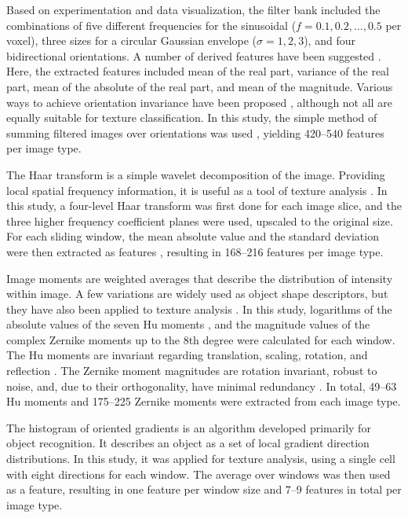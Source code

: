 \documentclass[10pt,letterpaper]{article}
\newcommand{\citep}{\cite}
\begin{document}
Based on experimentation and data visualization, the filter bank included the
combinations of five different frequencies for the sinusoidal
($f=0.1,0.2,…,0.5$ per voxel), three sizes for a circular Gaussian
envelope ($\sigma=1,2,3$), and four bidirectional orientations. A number of
derived features have been suggested \citep{Clausi2000, Hammouda2000,
Grigorescu2002}. Here, the extracted features included mean of the real part,
variance of the real part, mean of the absolute of the real part, and mean of
the magnitude. Various ways to achieve orientation invariance have been proposed
\citep{Arivazhagan2006, Han2007, Chu2009, Rahman2011}, although not all are
equally suitable for texture classification. In this study, the simple method of
summing filtered images over orientations was used \citep{Han2007}, yielding
420--540 features per image type.

The Haar transform is a simple wavelet decomposition of the image. Providing
local spatial frequency information, it is useful as a tool of texture analysis
\citep{Lonnestad1992}. In this study, a four-level Haar transform was first done
for each image slice, and the three higher frequency coefficient planes were
used, upscaled to the original size. For each sliding window, the mean absolute
value and the standard deviation were then extracted as features
\citep{Lonnestad1992}, resulting in 168--216 features per image type.

Image moments are weighted averages that describe the distribution of intensity
within image. A few variations are widely used as object shape descriptors, but
they have also been applied to texture analysis \citep{Tuceryan1994}. In this
study, logarithms of the absolute values of the seven Hu moments \citep{Hu1962},
and the magnitude values of the complex Zernike moments \citep{Teague1980} up to
the 8th degree were calculated for each window. The Hu moments are invariant
regarding translation, scaling, rotation, and reflection
\citep{Theodoridis2003}. The Zernike moment magnitudes are rotation invariant,
robust to noise, and, due to their orthogonality, have minimal redundancy
\citep{Tahmasbi2011, Amayeh2005}. In total, 49--63 Hu moments and 175--225
Zernike moments were extracted from each image type.

The histogram of oriented gradients \citep{Dalal2005} is an algorithm developed
primarily for object recognition. It describes an object as a set of local
gradient direction distributions. In this study, it was applied for texture
analysis, using a single cell with eight directions for each window. The average
over windows was then used as a feature, resulting in one feature per window
size and 7--9 features in total per image type.
\end{document}
